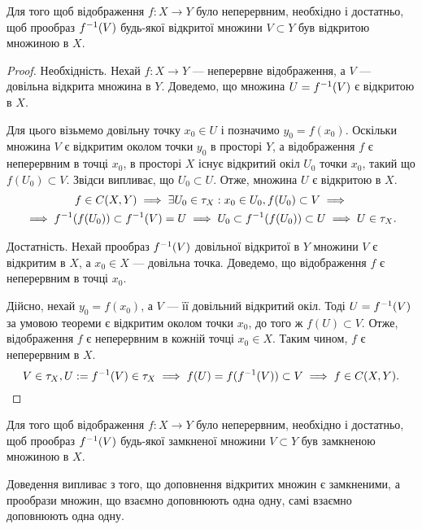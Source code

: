 \begin{theorem}
Для того щоб відображення $f: X \to Y$
було неперервним, необхідно і достатньо, щоб прообраз $f^{-1}(V)$
будь-якої відкритої множини $V \subset Y$ був відкритою
множиною в $X$.
\end{theorem}

\begin{proof}
Необхідність. Нехай $f: X \to Y$ --- неперервне відображення, а $V$ --- довільна
відкрита множина в $Y$. Доведемо, що множина $U = f^{-1}(V)$ є відкритою в $X$.

Для цього візьмемо довільну точку $x_0 \in U$ і позначимо $y_0 = f(x_0)$. Оскільки
множина $V$ є відкритим околом точки $y_0$ в просторі $Y$, а відображення $f$ є
неперервним в точці $x_0$, в просторі $X$ існує відкритий окіл $U_0$ точки $x_0$,
такий що $f(U_0) \subset V$. Звідси випливає, що $U_0 \subset U$. Отже,
множина $U$ є відкритою в $X$.
\begin{multline*}
f \in C(X, Y) \implies \exists U_0 \in \tau_X: x_0 \in U_0, f(U_0) \subset V \implies \\
\implies f^{-1}(f(U_0)) \subset f^{-1}(V) = U \implies U_0 \subset f^{-1}(f(U_0)) \subset U \implies U \in \tau_X.
\end{multline*}

Достатність. Нехай прообраз $f^{-1}(V)$ довільної
відкритої в $Y$ множини $V$ є відкритим в $X$, а $x_0 \in X$ ---
довільна точка. Доведемо, що відображення $f$ є неперервним
в точці $x_0$.

Дійсно, нехай $y_0 = f(x_0)$, а $V$ --- її довільний
відкритий окіл. Тоді $U = f^{-1}(V)$ за умовою теореми є
відкритим околом точки $x_0$, до того ж $f(U) \subset V$.
Отже, відображення $f$ є неперервним в
кожній точці $x_0 \in X$. Таким чином, $f$ є неперервним в $X$.
\begin{equation*}
V \in \tau_X, U := f^{-1}(V) \in \tau_X \implies
f(U) = f(f^{-1}(V)) \subset V \implies f \in C(X, Y). \qedhere
\end{equation*}
\end{proof}

\begin{theorem}
Для того щоб відображення $f: X \to Y$
було неперервним, необхідно і достатньо, щоб прообраз
$f^{-1}(V)$
будь-якої замкненої множини $V \subset Y$ був замкненою
множиною в $X$.
\end{theorem}

Доведення випливає з того, що доповнення відкритих
множин є замкненими, а прообрази множин, що взаємно
доповнюють одна одну, самі взаємно доповнюють одна
одну.

